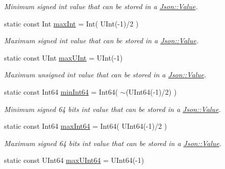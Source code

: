 \begin{DoxyCompactItemize}
\begin{DoxyCompactList}\small\item\em Minimum signed int value that can be stored in a \hyperlink{class_json_1_1_value}{Json\-::\-Value}. \end{DoxyCompactList}\item 
\hypertarget{class_json_1_1_value_a978c799a8af3114ef7dab6fd0a310a1b}{static const Int \hyperlink{class_json_1_1_value_a978c799a8af3114ef7dab6fd0a310a1b}{max\-Int} = Int( U\-Int(-\/1)/2 )}\label{class_json_1_1_value_a978c799a8af3114ef7dab6fd0a310a1b}

\begin{DoxyCompactList}\small\item\em Maximum signed int value that can be stored in a \hyperlink{class_json_1_1_value}{Json\-::\-Value}. \end{DoxyCompactList}\item 
\hypertarget{class_json_1_1_value_ac79e63ee68d3aa914bfd6988be669b87}{static const U\-Int \hyperlink{class_json_1_1_value_ac79e63ee68d3aa914bfd6988be669b87}{max\-U\-Int} = U\-Int(-\/1)}\label{class_json_1_1_value_ac79e63ee68d3aa914bfd6988be669b87}

\begin{DoxyCompactList}\small\item\em Maximum unsigned int value that can be stored in a \hyperlink{class_json_1_1_value}{Json\-::\-Value}. \end{DoxyCompactList}\item 
\hypertarget{class_json_1_1_value_a815ef899bc312c93bc426511acfe31a7}{static const Int64 \hyperlink{class_json_1_1_value_a815ef899bc312c93bc426511acfe31a7}{min\-Int64} = Int64( $\sim$(U\-Int64(-\/1)/2) )}\label{class_json_1_1_value_a815ef899bc312c93bc426511acfe31a7}

\begin{DoxyCompactList}\small\item\em Minimum signed 64 bits int value that can be stored in a \hyperlink{class_json_1_1_value}{Json\-::\-Value}. \end{DoxyCompactList}\item 
\hypertarget{class_json_1_1_value_a4492634870b8c5709ce967b384ac6006}{static const Int64 \hyperlink{class_json_1_1_value_a4492634870b8c5709ce967b384ac6006}{max\-Int64} = Int64( U\-Int64(-\/1)/2 )}\label{class_json_1_1_value_a4492634870b8c5709ce967b384ac6006}

\begin{DoxyCompactList}\small\item\em Maximum signed 64 bits int value that can be stored in a \hyperlink{class_json_1_1_value}{Json\-::\-Value}. \end{DoxyCompactList}\item 
\hypertarget{class_json_1_1_value_ae1eb89c305c39516696ff305cffa01da}{static const U\-Int64 \hyperlink{class_json_1_1_value_ae1eb89c305c39516696ff305cffa01da}{max\-U\-Int64} = U\-Int64(-\/1)}\label{class_json_1_1_value_ae1eb89c305c39516696ff305cffa01da}


\end{DoxyCompactItemize}
